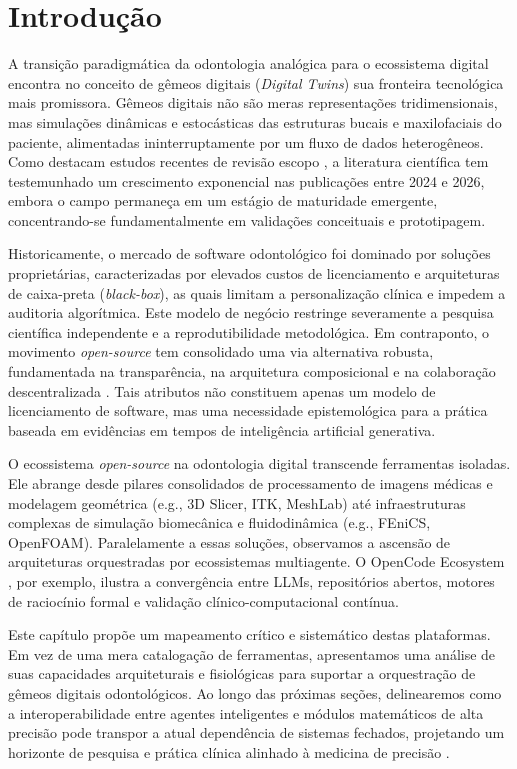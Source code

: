 \section{Introdução}

A transição paradigmática da odontologia analógica para o ecossistema digital encontra no conceito de gêmeos digitais (\textit{Digital Twins}) sua fronteira tecnológica mais promissora. Gêmeos digitais não são meras representações tridimensionais, mas simulações dinâmicas e estocásticas das estruturas bucais e maxilofaciais do paciente, alimentadas ininterruptamente por um fluxo de dados heterogêneos. Como destacam estudos recentes de revisão escopo \cite{duggal2026exploring, katsoulakis2024digital}, a literatura científica tem testemunhado um crescimento exponencial nas publicações entre 2024 e 2026, embora o campo permaneça em um estágio de maturidade emergente, concentrando-se fundamentalmente em validações conceituais e prototipagem.


Historicamente, o mercado de software odontológico foi dominado por soluções proprietárias, caracterizadas por elevados custos de licenciamento e arquiteturas de caixa-preta (\textit{black-box}), as quais limitam a personalização clínica e impedem a auditoria algorítmica. Este modelo de negócio restringe severamente a pesquisa científica independente e a reprodutibilidade metodológica. Em contraponto, o movimento \textit{open-source} tem consolidado uma via alternativa robusta, fundamentada na transparência, na arquitetura composicional e na colaboração descentralizada \cite{robles2023opentwins}. Tais atributos não constituem apenas um modelo de licenciamento de software, mas uma necessidade epistemológica para a prática baseada em evidências em tempos de inteligência artificial generativa.

O ecossistema \textit{open-source} na odontologia digital transcende ferramentas isoladas. Ele abrange desde pilares consolidados de processamento de imagens médicas e modelagem geométrica (e.g., 3D Slicer, ITK, MeshLab) até infraestruturas complexas de simulação biomecânica e fluidodinâmica (e.g., FEniCS, OpenFOAM). Paralelamente a essas soluções, observamos a ascensão de arquiteturas orquestradas por ecossistemas multiagente. O OpenCode Ecosystem \cite{opencode2026ecosystem}, por exemplo, ilustra a convergência entre LLMs, repositórios abertos, motores de raciocínio formal e validação clínico-computacional contínua.

Este capítulo propõe um mapeamento crítico e sistemático destas plataformas. Em vez de uma mera catalogação de ferramentas, apresentamos uma análise de suas capacidades arquiteturais e fisiológicas para suportar a orquestração de gêmeos digitais odontológicos. Ao longo das próximas seções, delinearemos como a interoperabilidade entre agentes inteligentes e módulos matemáticos de alta precisão pode transpor a atual dependência de sistemas fechados, projetando um horizonte de pesquisa e prática clínica alinhado à medicina de precisão \cite{towards2025precision}.
